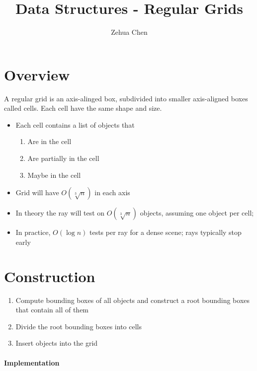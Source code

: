 \documentclass[letterpaper, 11pt]{article}
\title{Data Structures - Regular Grids}
\author{Zehua Chen}
\begin{document}
  \maketitle
  \tableofcontents

  \setmainstyles

  \section{Overview}

    A regular grid is an axis-alinged box, subdivided into smaller axis-aligned
    boxes called cells. Each cell have the same shape and size.

    \begin{itemize}
      \item Each cell contains a list of objects that
      \begin{enumerate}
        \item Are in the cell
        \item Are partially in the cell
        \item Maybe in the cell
      \end{enumerate}

      \item Grid will have $ O\left( \sqrt[3]{n} \right) $ in each axis
      \item In theory the ray will test on $ O\left( \sqrt[3]{n} \right) $
      objects, assuming one object per cell;
      \item In practice, $ O\left( \log n \right) $ tests per ray for a dense
      scene; rays typically stop early
    \end{itemize}

  \section{Construction}

    \begin{enumerate}
      \item Compute bounding boxes of all objects and construct a root
      bounding boxes that contain all of them
      \item Divide the root bounding boxes into cells
      \item Insert objects into the grid
    \end{enumerate}

    \paragraph{Implementation}
\end{document}
